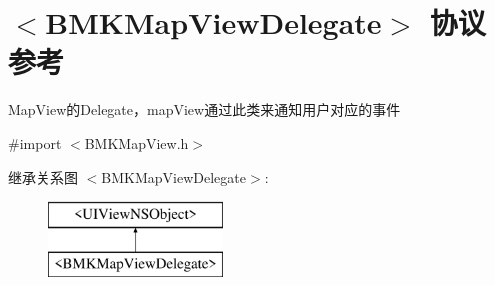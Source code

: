 \hypertarget{protocol_b_m_k_map_view_delegate-p}{\section{$<$B\-M\-K\-Map\-View\-Delegate$>$ 协议参考}
\label{protocol_b_m_k_map_view_delegate-p}
}


Map\-View的\-Delegate，map\-View通过此类来通知用户对应的事件  




{\ttfamily \#import $<$B\-M\-K\-Map\-View.\-h$>$}

继承关系图 $<$B\-M\-K\-Map\-View\-Delegate$>$\-:\begin{figure}[H]
\begin{center}
\leavevmode
\includegraphics[height=2.000000cm]{protocol_b_m_k_map_view_delegate-p}
\end{center}
\end{figure}
